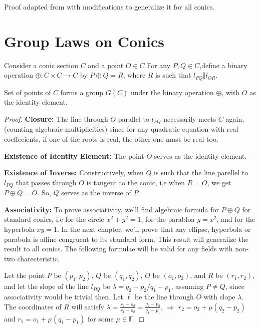 Proof adapted from \cite{brannan} with modifications to generalize it for all conics.

\section{Group Laws on Conics}

Consider a conic section $C$ and a point $O \in C$ For any $P,Q \in C$,define a binary
operation $\oplus :C \times C \rightarrow C$ by $P \oplus Q = R$, where $R$ is such that $l_{PQ} \Vert l_{OR}$.

\begin{theorem}
Set of points of $C$ forms a group $G(C)$ under the binary operation $\oplus$, with $O$ as the
identity element.
\end{theorem}

\begin{proof}\textbf{Closure:} The line through $O$ parallel to $l_{PQ}$ necessarily meets $C$
  again, (counting algebraic multiplicities) since for any quadratic equation with real 
  coeffecients, if one of the roots is real, the other one must be real too. \vspace{10pt}

  \textbf{Existence of Identity Element:} The point $O$ serves as the identity element. \vspace{0pt}

  \textbf{Existence of Inverse:} Constructively, when $Q$ is such that the line parellel to
  $l_{PQ}$ that passes through $O$ is tangent to the conic, i.e when $R=O$, we get
  $P\oplus Q=O$. So, $Q$ serves as the inverse of $P$. \vspace{10pt}

  \textbf{Associativity:} To prove associativity, we'll find algebraic formula for $P\oplus Q$
  for standard conics, i.e for the circle $x^2+y^2=1$, for the parabloa $y=x^2$, and for the
  hyperbola $xy=1$. In the next chapter, we'll prove that any ellipse, hyperbola or parabola
  is affine congruent to its standard form. This result will generalize the result to all
  conics. The following formulae will be valid for any fields with non-two charecteristic.

  Let the point $P$ be $(p_1,p_2)$, $Q$ be $(q_1,q_2)$, $O$ be $(o_1,o_2)$, and $R$ be
  $(r_1,r_2)$, and let the slope of the line $l_{PQ}$ be $\lambda=q_2-p_2/q_1-p_1$, assuming
  $P\not=Q$, since associativity would be trivial then. Let $\ell$ be the line through $O$
  with slope $\lambda$. The coordinates of $R$ will satisfy
  $\lambda=\frac{r_2-o_2}{r_1-o_2}=\frac{q_2-p_2}{q_1-p_1}$,
  $\Rightarrow$ $r_2=o_2+\mu(q_2-p_2)$ and $r_1=o_1+\mu(q_1-p_1)$ for some $\mu\in\mathbb{F}$.


\end{proof}

